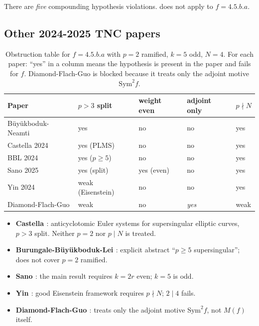 \documentclass[12pt]{amsart}
\theoremstyle{definition}
\begin{document}
There are \emph{five} compounding hypothesis violations.
\cite{BN26} does not apply to $f = 4.5.b.a$.

\subsection{Other 2024-2025 TNC papers}

\begin{table}[h]
\centering
\renewcommand{\arraystretch}{1.3}
\begin{tabular}{lllll}
\hline
Paper & $p > 3$ split & weight even & adjoint only & $p \nmid N$ \\
\hline
Büyükboduk-Neamti \cite{BN26} & yes & no & no & yes \\
Castella 2024 \cite{Cas24} & yes (PLMS) & no & no & yes \\
BBL 2024 \cite{BBL24} & yes ($p \geq 5$) & no & no & yes \\
Sano 2025 \cite{San25} & yes (split) & yes (even) & no & yes \\
Yin 2024 \cite{Yin24} & weak (Eisenstein) & no & no & yes \\
Diamond-Flach-Guo \cite{DFG25} & weak & no & \emph{yes} & weak \\
\hline
\end{tabular}
\caption{Obstruction table for $f = 4.5.b.a$ with $p=2$ ramified, $k=5$ odd, $N=4$.
For each paper: ``yes'' in a column means the hypothesis is present in the paper
and fails for $f$. Diamond-Flach-Guo is blocked because it treats only the adjoint motive $\mathrm{Sym}^2 f$.}
\label{tab:obstructions}
\end{table}

\begin{itemize}
  \item \textbf{Castella \cite{Cas24}}: anticyclotomic Euler systems for supersingular elliptic curves, $p > 3$ split. Neither $p=2$ nor $p \mid N$ is treated.
  \item \textbf{Burungale-Büyükboduk-Lei \cite{BBL24}}: explicit abstract ``$p \geq 5$ supersingular''; does not cover $p=2$ ramified.
  \item \textbf{Sano \cite{San25}}: the main result requires $k = 2r$ even; $k=5$ is odd.
  \item \textbf{Yin \cite{Yin24}}: good Eisenstein framework requires $p \nmid N$; $2 \mid 4$ fails.
  \item \textbf{Diamond-Flach-Guo \cite{DFG25}}: treats only the adjoint motive $\mathrm{Sym}^2 f$, not $M(f)$ itself.
\end{itemize}
\end{document}
